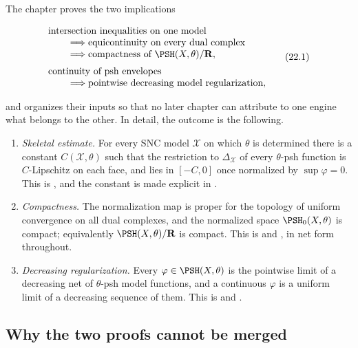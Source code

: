 The chapter proves the two implications

\[
 \begin{aligned}
 &\text{intersection inequalities on one model}\\[-1mm]
 &\qquad\Longrightarrow
   \text{equicontinuity on every dual complex}\\[-1mm]
 &\qquad\Longrightarrow
   \text{compactness of }\PSH(X,\theta)/\mathbf R,\\[1mm]
 &\text{continuity of psh envelopes}\\[-1mm]
 &\qquad\Longrightarrow
   \text{pointwise decreasing model regularization},
 \end{aligned}
\tag{22.1}\label{eq:ch22-architecture}
\]

and organizes their inputs so that no later chapter can attribute to one
engine what belongs to the other.  In detail, the outcome is the following.

\begin{enumerate}
\item \emph{Skeletal estimate.}  For every SNC model \(\mathcal X\) on which
\(\theta\) is determined there is a constant \(C(\mathcal X,\theta)\) such
that the restriction to \(\Delta_{\mathcal X}\) of every \(\theta\)-psh
function is \(C\)-Lipschitz on each face, and lies in \([-C,0]\) once
normalized by \(\sup\varphi=0\).  This is
, and the constant is made explicit in
.
\item \emph{Compactness.}  The normalization map is proper for the topology
of uniform convergence on all dual complexes, and the normalized space
\(\PSH_0(X,\theta)\) is compact; equivalently
\(\PSH(X,\theta)/\mathbf R\) is compact.  This is
 and
, in net form throughout.
\item \emph{Decreasing regularization.}  Every \(\varphi\in\PSH(X,\theta)\)
is the pointwise limit of a decreasing net of \(\theta\)-psh model
functions, and a continuous \(\varphi\) is a uniform limit of a decreasing
sequence of them.  This is
 and
.
\end{enumerate}

\subsection{Why the two proofs cannot be merged}
\label{sec:ch22-two-engines}

